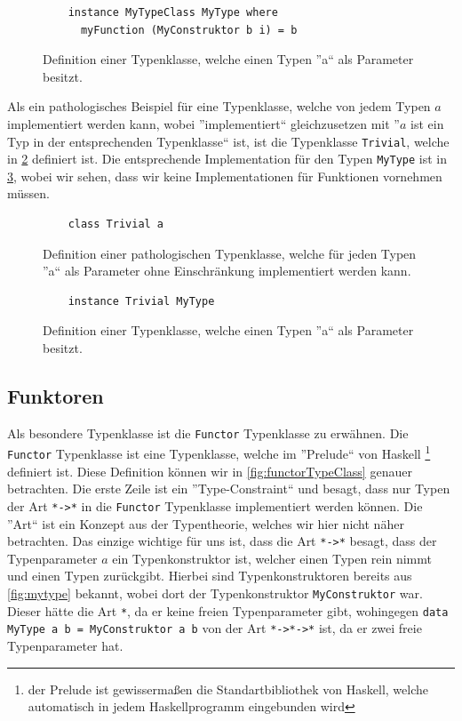 \documentclass{hhuarticle}
\theoremstyle{definition}
\theoremstyle{theorem}
\begin{document}
  \begin{figure}[h]
    \begin{lstlisting}
    instance MyTypeClass MyType where
      myFunction (MyConstruktor b i) = b
    \end{lstlisting}
    \caption{Definition einer Typenklasse, welche einen Typen ''a`` als Parameter besitzt.}%
    \label{fig:mytypeinstance}
  \end{figure}

  Als ein pathologisches Beispiel für eine Typenklasse, welche von jedem
  Typen $a$ implementiert werden kann, wobei ''implementiert`` gleichzusetzen
  mit ''$a$ ist ein Typ in der entsprechenden Typenklasse`` ist, ist die
  Typenklasse \verb|Trivial|, welche in \cref{fig:trivialTypeClass} definiert ist.
  Die entsprechende Implementation für den Typen \verb|MyType| ist in \cref{fig:trivialTypeClassInstance},
  wobei wir sehen, dass wir keine Implementationen
  für Funktionen vornehmen müssen.

  \begin{figure}[h]
    \begin{lstlisting}
    class Trivial a
    \end{lstlisting}
    \caption{Definition einer pathologischen Typenklasse, welche für jeden Typen ''a`` als Parameter ohne Einschränkung implementiert werden kann.}%
    \label{fig:trivialTypeClass}
  \end{figure}

  \begin{figure}[h]
    \begin{lstlisting}
    instance Trivial MyType
    \end{lstlisting}
    \caption{Definition einer Typenklasse, welche einen Typen ''a`` als Parameter besitzt.}%
    \label{fig:trivialTypeClassInstance}
  \end{figure}

  \subsection{Funktoren}

  Als besondere Typenklasse ist die \verb|Functor| Typenklasse zu
  erwähnen. Die \verb|Functor| Typenklasse ist eine Typenklasse, welche
  im ''Prelude`` von Haskell
  \footnote{der Prelude ist gewissermaßen die Standartbibliothek von
  Haskell, welche automatisch in jedem Haskellprogramm eingebunden wird}
  definiert ist. Diese Definition können wir in
  \cref{fig:functorTypeClass} genauer betrachten.
  Die erste Zeile ist ein ''Type-Constraint`` und besagt, dass
  nur Typen der Art \verb|*->*| in die \verb|Functor| Typenklasse
  implementiert werden können. Die ''Art`` ist ein Konzept
  aus der Typentheorie, welches wir hier nicht näher betrachten.
  Das einzige wichtige für uns ist, dass die Art \verb|*->*|
  besagt, dass der Typenparameter $a$ ein Typenkonstruktor ist,
  welcher einen Typen rein nimmt und einen Typen zurückgibt.
  Hierbei sind Typenkonstruktoren bereits aus \cref{fig:mytype} bekannt,
  wobei dort der Typenkonstruktor \verb|MyConstruktor| war. Dieser
  hätte die Art \verb|*|, da er keine freien Typenparameter gibt,
  wohingegen \verb|data MyType a b = MyConstruktor a b| von der
  Art \verb|*->*->*| ist, da er zwei freie Typenparameter hat.
\end{document}
